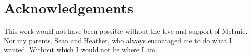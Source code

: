 \chapter{Acknowledgements}

This work would not have been possible without the love and support of Melanie. Nor my parents, Sean and Heather, who always encouraged me to do what I wanted. Without which I would not be where I am. 
